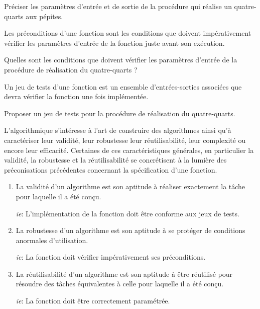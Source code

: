 \begin{question}
Préciser les paramètres d'entrée et de sortie
de la procédure qui réalise un quatre-quarts aux pépites.
\end{question}

Les préconditions d'une fonction sont les conditions que doivent 
impérativement vérifier les paramètres d'entrée de la fonction
juste avant son exécution.

\begin{question}
Quelles sont les conditions que doivent vérifier les paramètres d'entrée
de la procédure de réalisation du quatre-quarts ?
\end{question}

Un jeu de tests d'une fonction est un ensemble d'entrées-sorties associées
que devra vérifier la fonction une fois implémentée.

\begin{question}
Proposer un jeu de tests pour la procédure de réalisation du quatre-quarts.
\end{question}


L'algorithmique s'intéresse à l'art de construire 
des algorithmes ainsi qu'à caractériser leur validité, leur robustesse
leur réutilisabilité, leur complexité ou encore leur efficacité. Certaines 
de ces caractéristiques générales, en particulier la validité, la robustesse
et la réutilisabilité 
se concrétisent à la lumière des préconisations précédentes concernant 
la spécification d'une fonction.

\begin{enumerate}
\item La validité d'un algorithme est son aptitude à réaliser 
	exactement la tâche pour laquelle il a été conçu.

	{\em ie}: L'implémentation de la fonction doit être conforme aux jeux de tests.
\item La robustesse d'un algorithme est son aptitude à se 
	protéger de conditions anormales d'utilisation.

	{\em ie}: La fonction doit vérifier impérativement ses préconditions.
\item La réutilisabilité d'un algorithme est son aptitude 
	à être réutilisé pour résoudre des tâches équivalentes à celle pour 
	laquelle il a été conçu.

	{\em ie}: La fonction doit être correctement paramétrée.
\end{enumerate}


